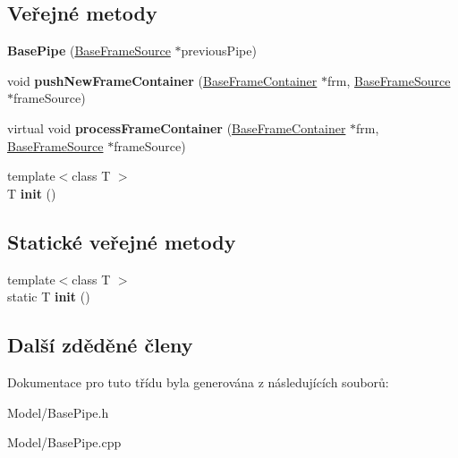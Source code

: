 \subsection*{Veřejné metody}
\begin{DoxyCompactItemize}
\item 
\hypertarget{class_ar_pipe_1_1_base_pipe_af407d5fe6eae18597926f8fcb95f91e5}{{\bfseries Base\-Pipe} (\hyperlink{class_ar_pipe_1_1_base_frame_source}{Base\-Frame\-Source} $\ast$previous\-Pipe)}\label{dd/d99/class_ar_pipe_1_1_base_pipe_af407d5fe6eae18597926f8fcb95f91e5}

\item 
\hypertarget{class_ar_pipe_1_1_base_pipe_aeca79efb909fc6d29e26eecfa480c22f}{void {\bfseries push\-New\-Frame\-Container} (\hyperlink{class_ar_pipe_1_1_base_frame_container}{Base\-Frame\-Container} $\ast$frm, \hyperlink{class_ar_pipe_1_1_base_frame_source}{Base\-Frame\-Source} $\ast$frame\-Source)}\label{dd/d99/class_ar_pipe_1_1_base_pipe_aeca79efb909fc6d29e26eecfa480c22f}

\item 
\hypertarget{class_ar_pipe_1_1_base_pipe_ae7b3a04a3110e7ff5a9cac8da0ed7bc4}{virtual void {\bfseries process\-Frame\-Container} (\hyperlink{class_ar_pipe_1_1_base_frame_container}{Base\-Frame\-Container} $\ast$frm, \hyperlink{class_ar_pipe_1_1_base_frame_source}{Base\-Frame\-Source} $\ast$frame\-Source)}\label{dd/d99/class_ar_pipe_1_1_base_pipe_ae7b3a04a3110e7ff5a9cac8da0ed7bc4}

\item 
\hypertarget{class_ar_pipe_1_1_base_pipe_ace97703be27ecda02138dc4f1fe71abd}{{\footnotesize template$<$class T $>$ }\\T {\bfseries init} ()}\label{dd/d99/class_ar_pipe_1_1_base_pipe_ace97703be27ecda02138dc4f1fe71abd}

\end{DoxyCompactItemize}
\subsection*{Statické veřejné metody}
\begin{DoxyCompactItemize}
\item 
\hypertarget{class_ar_pipe_1_1_base_pipe_aaf3ffa50c0d4999062b925a5e7306844}{{\footnotesize template$<$class T $>$ }\\static T {\bfseries init} ()}\label{dd/d99/class_ar_pipe_1_1_base_pipe_aaf3ffa50c0d4999062b925a5e7306844}

\end{DoxyCompactItemize}
\subsection*{Další zděděné členy}


Dokumentace pro tuto třídu byla generována z následujících souborů\-:\begin{DoxyCompactItemize}
\item 
Model/Base\-Pipe.\-h\item 
Model/Base\-Pipe.\-cpp\end{DoxyCompactItemize}
